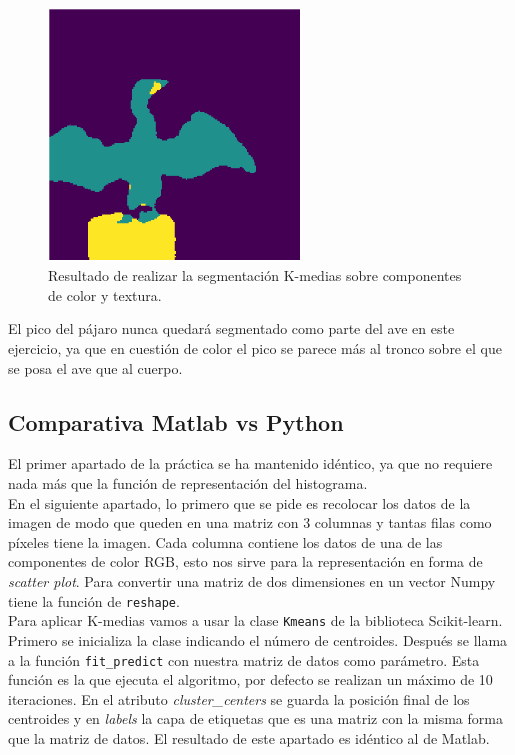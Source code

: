 \begin{figure}[h]
\centering
\includegraphics[width=0.6\textwidth]{imagenes/segmentacionabe}
\caption{Resultado de realizar la segmentación K-medias sobre componentes de color y textura.}
\label{segmentacionabe}
\end{figure}

El pico del pájaro nunca quedará segmentado como parte del ave en este ejercicio, ya que en cuestión de color el pico se parece más al tronco sobre el que se posa el ave que al cuerpo.\\


\subsection{Comparativa Matlab vs Python}

El primer apartado de la práctica se ha mantenido idéntico, ya que no requiere nada más que la función de representación del histograma.\\

En el siguiente apartado, lo primero que se pide es recolocar los datos de la imagen de modo que queden en una matriz con 3 columnas y tantas filas como píxeles tiene la imagen. Cada columna contiene los datos de una de las componentes de color RGB, esto nos sirve para la representación en forma de \emph{scatter plot}. Para convertir una matriz de dos dimensiones en un vector Numpy tiene la función de \texttt{reshape}. \\

Para aplicar K-medias vamos a usar la clase \texttt{Kmeans} de la biblioteca Scikit-learn. Primero se inicializa la clase indicando el número de centroides. Después se llama a la función \texttt{fit\_predict} con nuestra matriz de datos como parámetro. Esta función es la que ejecuta el algoritmo, por defecto se realizan un máximo de 10 iteraciones. En el atributo \emph{cluster\_centers} se guarda la posición final de los centroides y en \emph{labels} la capa de etiquetas que es una matriz con la misma forma que la matriz de datos. El resultado de este apartado es idéntico al de Matlab. \\

